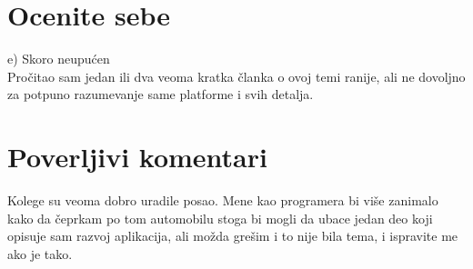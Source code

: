 \documentclass[a4paper]{article}
\begin{document}
	\section{Ocenite sebe}
	e) Skoro neupućen\\
	Pročitao sam jedan ili dva veoma kratka članka o ovoj temi ranije, ali ne dovoljno za potpuno razumevanje same platforme i svih detalja.
	
	
	
	\section{Poverljivi komentari}
	Kolege su veoma dobro uradile posao. Mene kao programera bi više zanimalo kako da čeprkam po tom automobilu stoga bi mogli da ubace jedan deo koji opisuje sam razvoj aplikacija, ali možda grešim i to nije bila tema, i ispravite me ako je tako.
	
\end{document}
